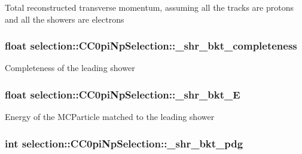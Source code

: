 Total reconstructed transverse momentum, assuming all the tracks are protons and all the showers are electrons \hypertarget{classselection_1_1CC0piNpSelection_ac3c3c9895ca501c3b73f14addfddf495}{
\subsubsection[{\-\_\-shr\-\_\-bkt\-\_\-completeness}]{\setlength{\rightskip}{0pt plus 5cm}float selection\-::\-C\-C0pi\-Np\-Selection\-::\-\_\-shr\-\_\-bkt\-\_\-completeness\hspace{0.3cm}{\ttfamily [private]}}}\label{classselection_1_1CC0piNpSelection_ac3c3c9895ca501c3b73f14addfddf495}
Completeness of the leading shower \hypertarget{classselection_1_1CC0piNpSelection_aa1a21f48d99a4de5f1d444aa3d64dedf}{
\subsubsection[{\-\_\-shr\-\_\-bkt\-\_\-\-E}]{\setlength{\rightskip}{0pt plus 5cm}float selection\-::\-C\-C0pi\-Np\-Selection\-::\-\_\-shr\-\_\-bkt\-\_\-\-E\hspace{0.3cm}{\ttfamily [private]}}}\label{classselection_1_1CC0piNpSelection_aa1a21f48d99a4de5f1d444aa3d64dedf}
Energy of the M\-C\-Particle matched to the leading shower \hypertarget{classselection_1_1CC0piNpSelection_aab09f93d7cd57031de714956414f3230}{
\subsubsection[{\-\_\-shr\-\_\-bkt\-\_\-pdg}]{\setlength{\rightskip}{0pt plus 5cm}int selection\-::\-C\-C0pi\-Np\-Selection\-::\-\_\-shr\-\_\-bkt\-\_\-pdg\hspace{0.3cm}{\ttfamily [private]}}}\label{classselection_1_1CC0piNpSelection_aab09f93d7cd57031de714956414f3230}
